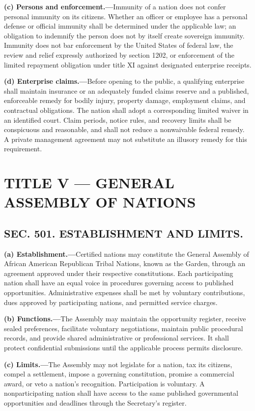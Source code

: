 \documentclass[12pt,letterpaper]{article}
\begin{document}
\textbf{(c) Persons and enforcement.---}Immunity of a nation does not confer personal immunity on its citizens. Whether an officer or employee has a personal defense or official immunity shall be determined under the applicable law; an obligation to indemnify the person does not by itself create sovereign immunity. Immunity does not bar enforcement by the United States of federal law, the review and relief expressly authorized by section 1202, or enforcement of the limited repayment obligation under title XI against designated enterprise receipts.

\textbf{(d) Enterprise claims.---}Before opening to the public, a qualifying enterprise shall maintain insurance or an adequately funded claims reserve and a published, enforceable remedy for bodily injury, property damage, employment claims, and contractual obligations. The nation shall adopt a corresponding limited waiver in an identified court. Claim periods, notice rules, and recovery limits shall be conspicuous and reasonable, and shall not reduce a nonwaivable federal remedy. A private management agreement may not substitute an illusory remedy for this requirement.

\section*{TITLE V --- GENERAL ASSEMBLY OF NATIONS}

\subsection*{SEC. 501. ESTABLISHMENT AND LIMITS.}

\textbf{(a) Establishment.---}Certified nations may constitute the General Assembly of African American Republican Tribal Nations, known as the Garden, through an agreement approved under their respective constitutions. Each participating nation shall have an equal voice in procedures governing access to published opportunities. Administrative expenses shall be met by voluntary contributions, dues approved by participating nations, and permitted service charges.

\textbf{(b) Functions.---}The Assembly may maintain the opportunity register, receive sealed preferences, facilitate voluntary negotiations, maintain public procedural records, and provide shared administrative or professional services. It shall protect confidential submissions until the applicable process permits disclosure.

\textbf{(c) Limits.---}The Assembly may not legislate for a nation, tax its citizens, compel a settlement, impose a governing constitution, promise a commercial award, or veto a nation's recognition. Participation is voluntary. A nonparticipating nation shall have access to the same published governmental opportunities and deadlines through the Secretary's register.
\end{document}

